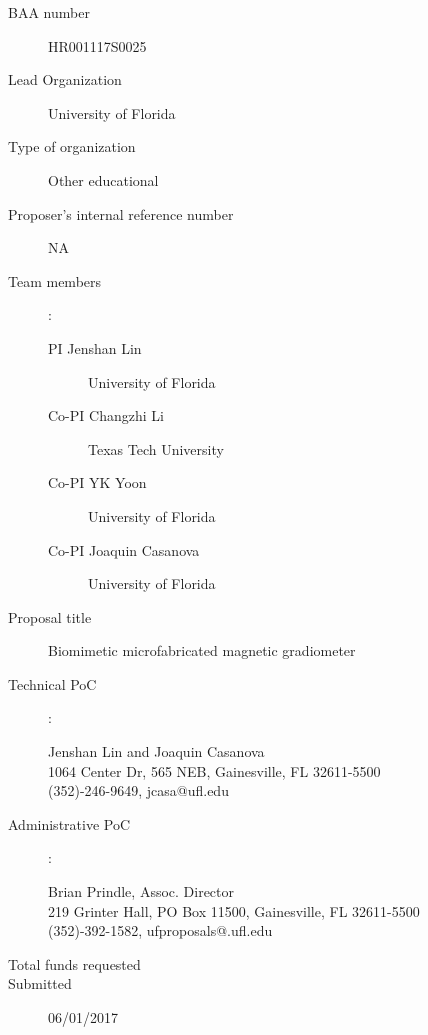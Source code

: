
\begin{description}
\item [BAA number] HR001117S0025
\item [Lead Organization] University of Florida
\item [Type of organization] Other educational
\item [Proposer’s internal reference number] NA
\item [Team members]:
  \begin{description}
  \item [PI Jenshan Lin] University of Florida 
  \item [Co-PI Changzhi Li] Texas Tech University
  \item [Co-PI YK Yoon] University of Florida 
  \item [Co-PI Joaquin Casanova] University of Florida 
  \end{description}
\item [Proposal title] Biomimetic microfabricated magnetic gradiometer
\item [Technical PoC]:
  \begin{description}
  \item [Jenshan Lin and Joaquin Casanova]
  \item [1064 Center Dr, 565 NEB, Gainesville, FL 32611-5500]
  \item [(352)-246-9649, jcasa@ufl.edu]
  \end{description}
\item [Administrative PoC]:
  \begin{description}
  \item [Brian Prindle, Assoc. Director]
  \item [219 Grinter Hall, PO Box 11500, Gainesville, FL 32611-5500]
  \item [(352)-392-1582, ufproposals@.ufl.edu]
  \end{description}
\item [Total funds requested]
\item [Submitted] 06/01/2017
\end{description}
